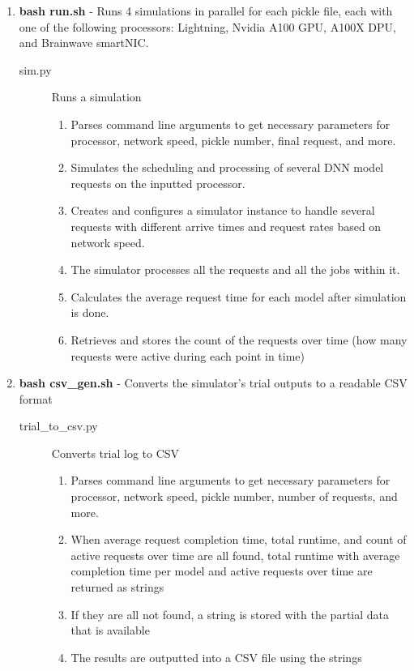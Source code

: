 \documentclass[11pt]{article}
\begin{document}
\begin{enumerate}
    \item \textbf{bash run.sh} - Runs 4 simulations in parallel for each pickle file, each with one of the following processors: Lightning, Nvidia A100 GPU, A100X DPU, and Brainwave smartNIC.
    \begin{description}
        \item[sim.py] Runs a simulation
        \begin{enumerate}
            \item Parses command line arguments to get necessary parameters for processor, network speed, pickle number, final request, and more.
            \item Simulates the scheduling and processing of several DNN model requests on the inputted processor.
            \item Creates and configures a simulator instance to handle several requests with different arrive times and request rates based on network speed.
            \item The simulator processes all the requests and all the jobs within it.
            \item Calculates the average request time for each model after simulation is done.
            \item Retrieves and stores the count of the requests over time (how many requests were active during each point in time)
            
        \end{enumerate}
    \end{description}

    \item \textbf{bash csv\_gen.sh} - Converts the simulator's trial outputs to a readable CSV format
    \begin{description}
        \item[trial\_to\_csv.py] Converts trial log to CSV
        \begin{enumerate}
            \item Parses command line arguments to get necessary parameters for processor, network speed, pickle number, number of requests, and more.
            \item When average request completion time, total runtime, and count of active requests over time are all found, total runtime with average completion time per model and active requests over time are returned as strings
            \item If they are all not found, a string is stored with the partial data that is available
            \item The results are outputted into a CSV file using the strings
        \end{enumerate}
    \end{description}


\end{enumerate}
\end{document}
